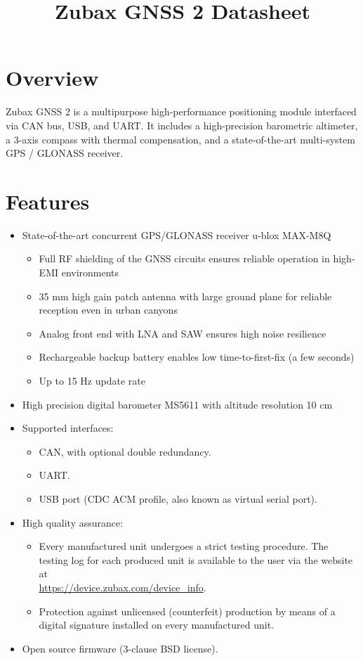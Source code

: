 \documentclass{zubaxdoc}
\title{Zubax GNSS 2 Datasheet}
\begin{document}
\frontmatter

\begin{titlepage}

\section*{Overview}

Zubax GNSS 2 is a multipurpose high-performance positioning module interfaced via CAN bus, USB, and UART. It includes a high-precision barometric altimeter, a 3-axis compass with thermal compensation, and a state-of-the-art multi-system GPS / GLONASS receiver.

\section*{Features}

\begin{itemize}
    \item State-of-the-art concurrent GPS/GLONASS receiver u-blox MAX-M8Q
    \begin{itemize}
    		\item Full RF shielding of the GNSS circuits ensures reliable operation in high-EMI environments
    		\item 35 mm high gain patch antenna with large ground plane for reliable reception even in urban canyons
    		\item Analog front end with LNA and SAW ensures high noise resilience
    		\item Rechargeable backup battery enables low time-to-first-fix (a few seconds)
    		\item Up to 15 Hz update rate
    	\end{itemize}
	\item High precision digital barometer MS5611 with  altitude resolution 10 cm
	\item Supported interfaces:
    \begin{itemize}
        \item CAN, with optional double redundancy.
        \item UART.
        \item USB port (CDC ACM profile, also known as virtual serial port).
    \end{itemize}
    \item High quality assurance:
    \begin{itemize}
        \item Every manufactured unit undergoes a strict testing procedure.
        The testing log for each produced unit is available to the user via the website at\\
        \url{https://device.zubax.com/device_info}.
        \item Protection against unlicensed (counterfeit) production by means of a digital signature
        installed on every manufactured unit.
    \end{itemize}
    \item Open source firmware (3-clause BSD license).
\end{itemize}


\end{titlepage}
\end{document}
